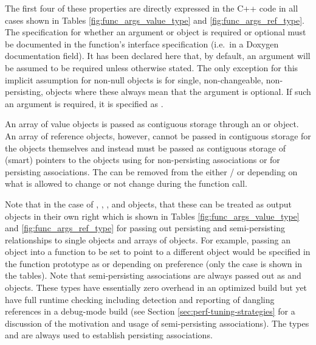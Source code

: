 \documentclass[pdf,ps2pdf,11pt]{SANDreport}
\begin{document}
The first four of these properties are directly expressed in the C++
code in all cases shown in Tables {}\ref{fig:func_args_value_type} and
{}\ref{fig:func_args_ref_type}.  The specification for whether an
argument or object is required or optional must be documented in the
function's interface specification (i.e.\ in a Doxygen documentation
{} field).  It has been declared here that, by default, an
argument will be assumed to be required unless otherwise stated.  The
only exception for this implicit assumption for non-null objects is
{} for single, non-changeable,
non-persisting, objects where these always mean that the argument is
optional.  If such an argument is required, it is specified as
{}.

An array of value objects is passed as contiguous storage through an
{} or {} object.  An
array of reference objects, however, cannot be passed in contiguous
storage for the objects themselves and instead must be passed as
contiguous storage of (smart) pointers to the objects using
{} for non-persisting
associations or {} for
persisting associations.  The {} can be removed from the
either {}/{} or {} depending on what
is allowed to change or not change during the function call.

Note that in the case of {}, {}, {},
and {} objects, that these can be treated as output
objects in their own right which is shown in Tables
{}\ref{fig:func_args_value_type} and {}\ref{fig:func_args_ref_type}
for passing out persisting and semi-persisting relationships to single
objects and arrays of objects.  For example, passing an {}
object into a function to be set to point to a different {}
object would be specified in the function prototype as {} or {} depending on preference (only the
case {} is shown in the tables).  Note that
semi-persisting associations are always passed out as {} and
{} objects.  These types have essentially zero overhead
in an optimized build but yet have full runtime checking including
detection and reporting of dangling references in a debug-mode build
(see Section {}\ref{sec:perf-tuning-strategies} for a discussion of
the motivation and usage of semi-persisting associations).  The types
{} and {} are always used to establish
persisting associations.
\end{document}
